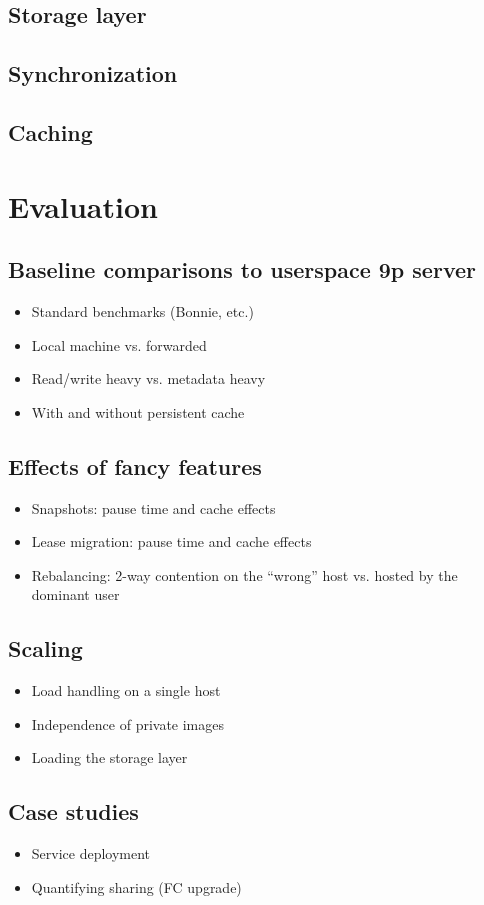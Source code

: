 \documentclass[a4paper]{article}
\begin{document}
\subsection{Storage layer}
\subsection{Synchronization}
\subsection{Caching}

\section{Evaluation}

\subsection{Baseline comparisons to userspace 9p server}
\begin{itemize}
\item Standard benchmarks (Bonnie, etc.)
\item Local machine vs. forwarded
\item Read/write heavy vs. metadata heavy
\item With and without persistent cache
\end{itemize}
\subsection{Effects of fancy features}
\begin{itemize}
\item Snapshots: pause time and cache effects
\item Lease migration: pause time and cache effects
\item Rebalancing: 2-way contention on the ``wrong'' host vs. hosted by the dominant user
\end{itemize}
\subsection{Scaling}
\begin{itemize}
\item Load handling on a single host
\item Independence of private images
\item Loading the storage layer
\end{itemize}
\subsection{Case studies}
\begin{itemize}
\item Service deployment
\item Quantifying sharing (FC upgrade)
\end{itemize}
\end{document}
